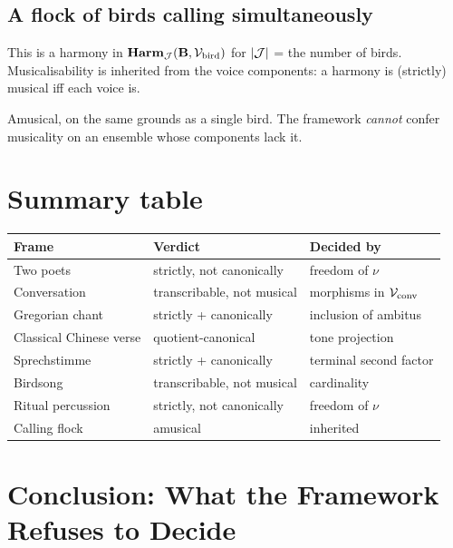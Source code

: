 \subsection{A flock of birds calling simultaneously}
This is a harmony in $\mathbf{Harm}_{\mathcal{J}}(\mathbf{B}, \mathcal{V}_{\mathrm{bird}})$ for
$|\mathcal{J}|$ = the number of birds. Musicalisability is inherited from the
voice components: a harmony is (strictly) musical iff each voice is.

\begin{verdict}
Amusical, on the same grounds as a single bird. The framework
\emph{cannot} confer musicality on an ensemble whose components lack
it.
\end{verdict}

\section{Summary table}

\begin{center}\small
\renewcommand{\arraystretch}{1.25}
\begin{tabular}{lll}
\hline
\textbf{Frame} & \textbf{Verdict} & \textbf{Decided by} \\
\hline
Two poets               & strictly, not canonically  & freedom of $\nu$ \\
Conversation            & transcribable, not musical & morphisms in $\mathcal{V}_{\mathrm{conv}}$ \\
Gregorian chant         & strictly + canonically     & inclusion of ambitus \\
Classical Chinese verse & quotient-canonical         & tone projection \\
Sprechstimme            & strictly + canonically     & terminal second factor \\
Birdsong                & transcribable, not musical & cardinality \\
Ritual percussion       & strictly, not canonically  & freedom of $\nu$ \\
Calling flock           & amusical                   & inherited \\
\hline
\end{tabular}
\end{center}

\section{Conclusion: What the Framework Refuses to Decide}

